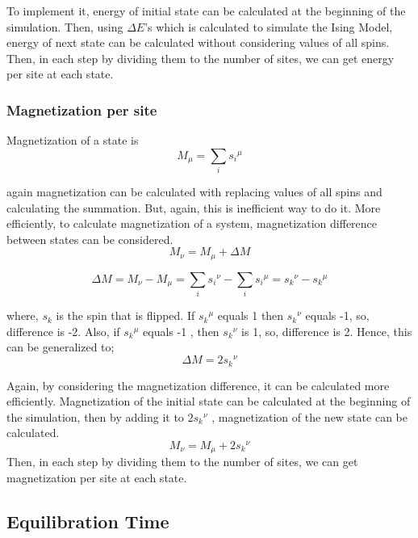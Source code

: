 \documentclass[12pt,fleqn]{report}
\begin{document}
To implement it, energy of initial state can be calculated at the beginning 
of the simulation. Then, using $\Delta E$'s which is calculated to simulate 
the Ising Model, energy of next state can be calculated without considering 
values of all spins. Then, in each step by dividing them to the number of 
sites, we can get energy per site at each state. 

\subsubsection{Magnetization per site}

Magnetization of a state is 
\begin{equation}
M_\mu = \sum\limits_{i} {s_i}^\mu
\end{equation}

again magnetization can be calculated with replacing values of all spins 
and calculating the summation. But, again, this is inefficient way to do it. 
More efficiently, to calculate magnetization of a system, magnetization 
difference between states can be considered. 
\begin{equation}
M_\nu = M_\mu + \Delta M
\end{equation}

\begin{equation}
\Delta M = M_\nu - M_\mu =  \sum\limits_{i} {s_i}^\nu - \sum\limits_{i} 
{s_i}^\mu = {s_k}^\nu -  {s_k}^\mu
\end{equation}

where, $s_k$ is the spin that is flipped. If $ {s_k}^\mu$ equals 1 then $ 
{s_k}^\nu$ equals -1, so, difference is -2. Also, if $ {s_k}^\mu$ equals -1 , 
then $ {s_k}^\nu$ is 1, so, difference is 2. Hence, this can be generalized 
to;
\begin{equation}
\Delta M =  2{s_k}^\nu
\end{equation}  

Again, by considering the magnetization difference, it can be calculated 
more efficiently. Magnetization of the initial state can be calculated at the 
beginning of the simulation, then by adding it to $ 2{s_k}^\nu$ , 
magnetization of the new state can be calculated.
\begin{equation}
M_\nu = M_\mu +  2{s_k}^\nu
\end{equation}
Then, in each step by dividing them to the number of sites, we can get 
magnetization per site at each state. 

\subsection{Equilibration Time}
\end{document}
